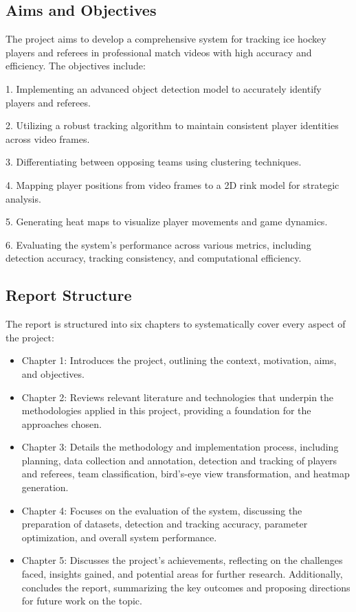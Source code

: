 \documentclass[12pt, letterpaper]{article}
\begin{document}
{
\setlength{\parskip}{0.3cm}
\subsection{Aims and Objectives}
The project aims to develop a comprehensive system for tracking ice hockey players and referees in professional match videos with high accuracy and efficiency. The objectives include:

1. Implementing an advanced object detection model to accurately identify players and referees.

2. Utilizing a robust tracking algorithm to maintain consistent player identities across video frames.

3. Differentiating between opposing teams using clustering techniques.

4. Mapping player positions from video frames to a 2D rink model for strategic analysis.

5. Generating heat maps to visualize player movements and game dynamics.

6. Evaluating the system's performance across various metrics, including detection accuracy, tracking consistency, and computational efficiency.
}

{
\setlength{\parskip}{0.3cm} %
\subsection{Report Structure}
The report is structured into six chapters to systematically cover every aspect of the project:

\begin{itemize}
    \item Chapter 1: Introduces the project, outlining the context, motivation, aims, and objectives.
    
    \item Chapter 2: Reviews relevant literature and technologies that underpin the methodologies applied in this project, providing a foundation for the approaches chosen.
    
    \item Chapter 3: Details the methodology and implementation process, including planning, data collection and annotation, detection and tracking of players and referees, team classification, bird’s-eye view transformation, and heatmap generation.
    
    \item Chapter 4: Focuses on the evaluation of the system, discussing the preparation of datasets, detection and tracking accuracy, parameter optimization, and overall system performance.
    
    \item Chapter 5: Discusses the project's achievements, reflecting on the challenges faced, insights gained, and potential areas for further research. Additionally, concludes the report, summarizing the key outcomes and proposing directions for future work on the topic.
\end{itemize}
}
\newpage
\end{document}

